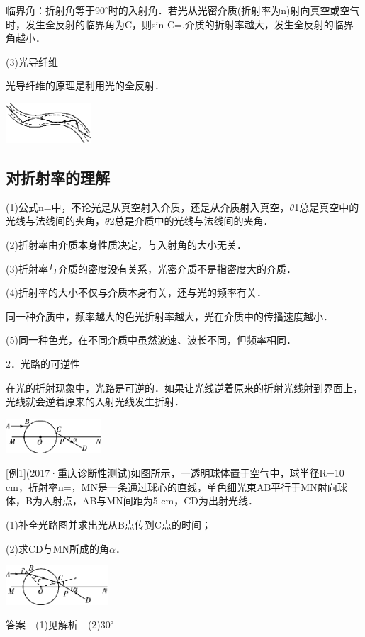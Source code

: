 临界角：折射角等于$90^\circ$时的入射角．若光从光密介质(折射率为n)射向真空或空气时，发生全反射的临界角为C，则sin
C=.介质的折射率越大，发生全反射的临界角越小．

(3)光导纤维

光导纤维的原理是利用光的全反射．

\begin{center}\includegraphics[width=1.25486in,height=0.59444in]{media/image546.png}\end{center}
\subsection{对折射率的理解}

(1)公式n=中，不论光是从真空射入介质，还是从介质射入真空，$\theta$1总是真空中的光线与法线间的夹角，$\theta$2总是介质中的光线与法线间的夹角．

(2)折射率由介质本身性质决定，与入射角的大小无关．

(3)折射率与介质的密度没有关系，光密介质不是指密度大的介质．

(4)折射率的大小不仅与介质本身有关，还与光的频率有关．

同一种介质中，频率越大的色光折射率越大，光在介质中的传播速度越小．

(5)同一种色光，在不同介质中虽然波速、波长不同，但频率相同．

2．光路的可逆性

在光的折射现象中，光路是可逆的．如果让光线逆着原来的折射光线射到界面上，光线就会逆着原来的入射光线发生折射．

\begin{center}\includegraphics[width=1.40556in,height=0.50972in]{media/image547.png}\end{center}
{[}例1{]}(2017·重庆诊断性测试)如图所示，一透明球体置于空气中，球半径R=10
cm，折射率n=，MN是一条通过球心的直线，单色细光束AB平行于MN射向球体，B为入射点，AB与MN间距为5
cm，CD为出射光线．

(1)补全光路图并求出光从B点传到C点的时间；

(2)求CD与MN所成的角$\alpha$．

\begin{center}\includegraphics[width=1.5in,height=0.57569in]{media/image548.png}\end{center}
答案　(1)见解析　(2)$30^\circ$

